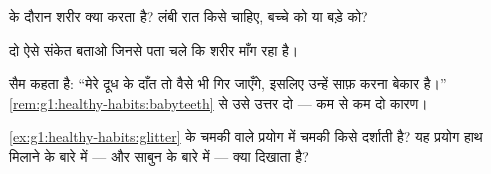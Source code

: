 \begin{exercise}[$\star$]\label{exo:g1:healthy-habits:7}
 के दौरान शरीर क्या करता है? लंबी रात किसे चाहिए, बच्चे को या
बड़े को?
\end{exercise}

\begin{exercise}[$\star$]\label{exo:g1:healthy-habits:8}
दो ऐसे संकेत बताओ जिनसे पता चले कि शरीर  माँग रहा है।
\end{exercise}

\begin{exercise}[$\star\star$]\label{exo:g1:healthy-habits:9}
सैम कहता है: ``मेरे दूध के दाँत तो वैसे भी गिर जाएँगे, इसलिए उन्हें
साफ़ करना बेकार है।'' \cref{rem:g1:healthy-habits:babyteeth} से उसे
उत्तर दो --- कम से कम दो कारण।
\end{exercise}

\begin{exercise}[$\star\star$]\label{exo:g1:healthy-habits:10}
\cref{ex:g1:healthy-habits:glitter} के चमकी वाले प्रयोग में चमकी किसे
दर्शाती है? यह प्रयोग हाथ मिलाने के बारे में --- और साबुन के बारे में
--- क्या दिखाता है?
\end{exercise}
